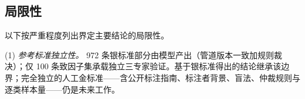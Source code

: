 \documentclass[11pt]{article}
\begin{document}
\subsection{{\cjkfont 局\allowbreak 限\allowbreak 性}}
{\cjkfont 以\allowbreak 下\allowbreak 按\allowbreak 严\allowbreak 重\allowbreak 程\allowbreak 度\allowbreak 列\allowbreak 出\allowbreak 界\allowbreak 定\allowbreak 主\allowbreak 要\allowbreak 结\allowbreak 论\allowbreak 的\allowbreak 局\allowbreak 限\allowbreak 性\allowbreak 。}

(1) \textit{{\cjkfont 参\allowbreak 考\allowbreak 标\allowbreak 准\allowbreak 独\allowbreak 立\allowbreak 性\allowbreak 。}} 972 {\cjkfont 条\allowbreak 银\allowbreak 标\allowbreak 准\allowbreak 部\allowbreak 分\allowbreak 由\allowbreak 模\allowbreak 型\allowbreak 产\allowbreak 出\allowbreak （\allowbreak 管\allowbreak 道\allowbreak 版\allowbreak 本\allowbreak 一\allowbreak 致\allowbreak 加\allowbreak 规\allowbreak 则\allowbreak 裁\allowbreak 决\allowbreak ）\allowbreak ；\allowbreak 仅} 100 {\cjkfont 条\allowbreak 致\allowbreak 因\allowbreak 子\allowbreak 集\allowbreak 承\allowbreak 载\allowbreak 独\allowbreak 立\allowbreak 三\allowbreak 专\allowbreak 家\allowbreak 验\allowbreak 证\allowbreak 。\allowbreak 基\allowbreak 于\allowbreak 银\allowbreak 标\allowbreak 准\allowbreak 得\allowbreak 出\allowbreak 的\allowbreak 结\allowbreak 论\allowbreak 继\allowbreak 承\allowbreak 该\allowbreak 边\allowbreak 界\allowbreak ；\allowbreak 完\allowbreak 全\allowbreak 独\allowbreak 立\allowbreak 的\allowbreak 人\allowbreak 工\allowbreak 金\allowbreak 标\allowbreak 准}------{\cjkfont 含\allowbreak 公\allowbreak 开\allowbreak 标\allowbreak 注\allowbreak 指\allowbreak 南\allowbreak 、\allowbreak 标\allowbreak 注\allowbreak 者\allowbreak 背\allowbreak 景\allowbreak 、\allowbreak 盲\allowbreak 法\allowbreak 、\allowbreak 仲\allowbreak 裁\allowbreak 规\allowbreak 则\allowbreak 与\allowbreak 逐\allowbreak 类\allowbreak 样\allowbreak 本\allowbreak 量}------{\cjkfont 仍\allowbreak 是\allowbreak 未\allowbreak 来\allowbreak 工\allowbreak 作\allowbreak 。}
\end{document}
